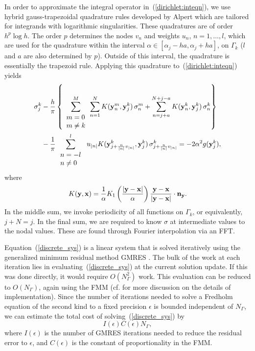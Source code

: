 \documentclass[preprint,12pt]{elsarticle}
\newcommand{\x}{{\bf x}}
\newcommand{\y}{{\bf y}}
\newcommand{\eqr}[1]{~(\ref{#1})}
\begin{document}
In order to approximate the integral operator in\eqr{dirichlet:inteqn}, we use 
hybrid gauss-trapezoidal quadrature rules developed by Alpert \cite{alpert:quad:rules} which are tailored for integrands with logarithmic singularities. 
These quadratures are of order $h^p \log h$. 
The order $p$ determines the nodes $v_n$ and weights  $u_n$, $n=1,\ldots, l$, which are used for the quadrature within the interval $\alpha \in [\alpha_j- h a, \alpha_j+h a]$, on $\Gamma_k$ ($l$ and $a$ are also determined by $p$). 
Outside of this interval, the quadrature is essentially the trapezoid rule.
Applying this quadrature to\eqr{dirichlet:inteqn} yields
\begin{align}
    \sigma_j^k & - \frac{h}{\pi} \left\{
    \sum_{\begin{array}{l}
                             m=0  \\
                            m \ne k
                         \end{array} }^M  \sum_{n=1}^{N} K(\y^m_n,\y^k_j)\, \sigma^m_n + \sum_{n=j+a}^{N + j-a} K(\y^k_n,\y^k_j)\, \sigma^k_n  \right\}  
                         \nonumber \\
    &   -\frac{1}{\pi} \sum_{\begin{array}{l}
                             n=-l  \\
                            n \ne 0
                         \end{array} }^l \, u_{|n|} 
             K(\y^k_{j + \frac{ n}{|n|} v_{|n|}}, \y^k_j ) 
            \, \sigma^k_{j + \frac{n}{|n|} v_{|n|}} 
             =  -2 \alpha^2  g(\y_j^k),          
             \label{discrete_sys}
\end{align}
where
\[
K(\y,\x) = \frac{1}{\alpha} K_1 \left( \frac{|\y - \x|}{\alpha} \right)
                         \frac{\y-\x }{|\y - \x|} \cdot {\bf n}_{\y}. 
\]
In the middle sum, we invoke periodicity of all functions on $\Gamma_k$, or equivalently, $j+N = j$. In the final sum, we are required to know $\sigma$ at intermediate values to the nodal values.  These are found through Fourier interpolation via an FFT.

Equation\eqr{discrete_sys} is a linear system that is solved iteratively using the generalized minimum residual method GMRES \cite{SAAD}. 
The bulk of the work at each iteration lies in evaluating\eqr{discrete_sys} at the current solution update. 
If this was done directly, it would require $O(N^2_\Gamma)$ work. 
This evaluation can be reduced to $O(N_\Gamma)$, again using the FMM (cf. \cite{KROP_QUAIFE_1} for more discussion on the details of implementation). 
Since the number of iterations needed to solve a Fredholm equation of the second kind to a fixed precision $\epsilon$ is bounded independent of $N_\Gamma$, we can estimate the total cost of solving\eqr{discrete_sys} by
\[
   I(\epsilon) C(\epsilon) N_\Gamma,
\]
where $I(\epsilon)$ is the number of GMRES iterations needed to reduce the residual error to $\epsilon$, and $C(\epsilon)$ is the constant of proportionality in the FMM. 
\end{document}
